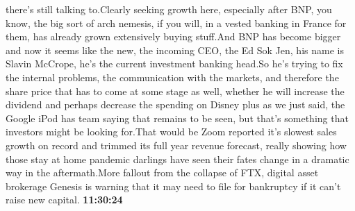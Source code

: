 \documentclass{article}%
\begin{document}
there's still talking to.Clearly seeking growth here, especially after BNP, you know, the big sort of arch nemesis, if you will, in a vested banking in France for them, has already grown extensively buying stuff.And BNP has become bigger and now it seems like the new, the incoming CEO, the Ed Sok Jen, his name is Slavin McCrope, he's the current investment banking head.So he's trying to fix the internal problems, the communication with the markets, and therefore the share price that has to come at some stage as well, whether he will increase the dividend and perhaps decrease the spending on Disney plus as we just said, the Google iPod has team saying that remains to be seen, but that's something that investors might be looking for.That would be Zoom reported it's slowest sales growth on record and trimmed its full year revenue forecast, really showing how those stay at home pandemic darlings have seen their fates change in a dramatic way in the aftermath.More fallout from the collapse of FTX, digital asset brokerage Genesis is warning that it may need to file for bankruptcy if it can't raise new capital.%
\textbf{11:30:24}%
\newline%
\end{document}
